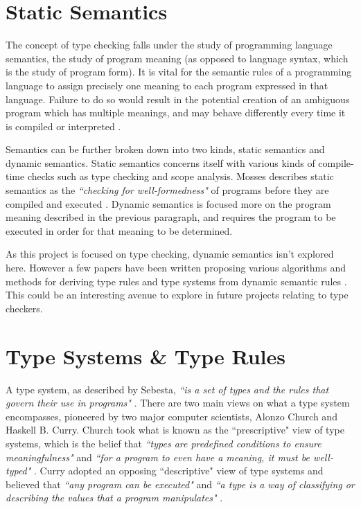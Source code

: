 \documentclass{UoYCSproject}
\begin{document}
\section{Static Semantics}
The concept of type checking falls under the study of programming language
semantics, the study of program meaning (as opposed to language syntax, which is
the study of program form). It is vital for the semantic rules of a programming
language to assign precisely one meaning to each program expressed in that
language. Failure to do so would result in the potential creation of an
ambiguous program which has multiple meanings, and may behave differently every
time it is compiled or interpreted \cite[p.~114]{Sebesta}.

Semantics can be further broken down into two kinds, static semantics and
dynamic semantics. Static semantics concerns itself with various kinds
of compile-time checks such as type checking and scope analysis. Mosses
describes static semantics as the \textit{``checking for well-formedness"} of
programs before they are compiled and executed \cite{Mosses}. Dynamic
semantics is focused more on the program meaning described in the previous
paragraph, and requires the program to be executed in order for that meaning to
be determined.

As this project is focused on type checking, dynamic semantics
isn't explored here. However a few papers have been written
proposing various algorithms and methods for deriving type rules and type
systems from dynamic semantic rules \cite{NeilJones} \cite{JohnHannan}. This could
be an interesting avenue to explore in future projects relating to type checkers.

\section{Type Systems \& Type Rules}
\label{sec:Chap1TypeSystems}

A type system, as described by Sebesta, \textit{``is a set of types and the rules that
    govern their use in programs"} \cite[\S6, p.~309]{Sebesta}.
There are two main views on what a type system encompasses, pioneered by two
major computer scientists, Alonzo Church and Haskell B. Curry.
Church took what is known as the ``prescriptive" view of type systems, which is
the belief that \textit{``types are predefined conditions to ensure meaningfulness"}
and \textit{``for a program to even have a meaning, it must be well-typed"}
\cite{NeilJones}. Curry adopted an opposing ``descriptive" view of type systems
and believed that \textit{``any program can be executed"} and \textit{``a type
    is a way of classifying or describing the values that a program manipulates"}
\cite{NeilJones}.
\end{document}
